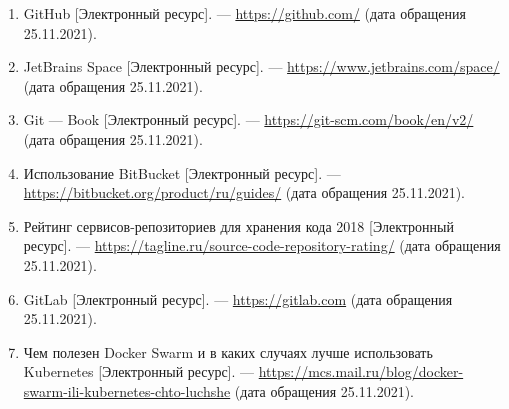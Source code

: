 \begin{enumerate}
    \item GitHub [Электронный ресурс]. — \url{https://github.com/} (дата обращения 25.11.2021).
    \item JetBrains Space [Электронный ресурс]. — \url{https://www.jetbrains.com/space/} (дата обращения 25.11.2021).
    \item Git --- Book [Электронный ресурс]. — \url{https://git-scm.com/book/en/v2/} (дата обращения 25.11.2021).
    \item Использование BitBucket [Электронный ресурс]. — \url{https://bitbucket.org/product/ru/guides/} (дата обращения 25.11.2021).
    \item Рейтинг сервисов-репозиториев для хранения кода 2018 [Электронный ресурс]. — \url{https://tagline.ru/source-code-repository-rating/} (дата обращения 25.11.2021).
    \item GitLab [Электронный ресурс]. — \url{https://gitlab.com} (дата обращения 25.11.2021).
    \item Чем полезен Docker Swarm и в каких случаях лучше использовать Kubernetes [Электронный ресурс]. — \url{https://mcs.mail.ru/blog/docker-swarm-ili-kubernetes-chto-luchshe} (дата обращения 25.11.2021).
\end{enumerate}